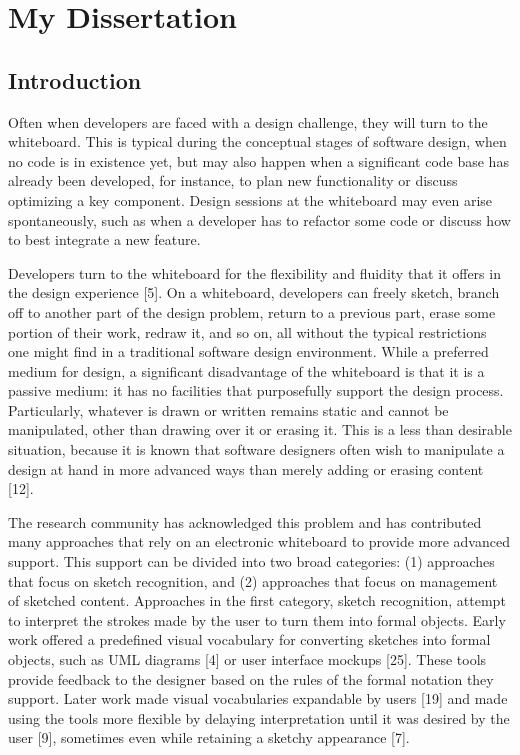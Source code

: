 \chapter{My Dissertation}
\label{chapter:thesis}

\section{Introduction}

Often when developers are faced with a design challenge, they will turn to the whiteboard.  This is typical during the conceptual stages of software design, when no code is in existence yet, but may also happen when a significant code base has already been developed, for instance, to plan new functionality or discuss optimizing a key component. Design sessions at the whiteboard may even arise spontaneously, such as when a developer has to refactor some code or discuss how to best integrate a new feature.

Developers turn to the whiteboard for the flexibility and fluidity that it offers in the design experience [5]. On a whiteboard, developers can freely sketch, branch off to another part of the design problem, return to a previous part, erase some portion of their work, redraw it, and so on, all without the typical restrictions one might find in a traditional software design environment. 
While a preferred medium for design, a significant disadvantage of the whiteboard is that it is a passive medium: it has no facilities that purposefully support the design process. Particularly, whatever is drawn or written remains static and cannot be manipulated, other than drawing over it or erasing it. This is a less than desirable situation, because it is known that software designers often wish to manipulate a design at hand in more advanced ways than merely adding or erasing content [12].

The research community has acknowledged this problem and has contributed many approaches that rely on an electronic whiteboard to provide more advanced support. This support can be divided into two broad categories: (1) approaches that focus on sketch recognition, and (2) approaches that focus on management of sketched content. Approaches in the first category, sketch recognition, attempt to interpret the strokes made by the user to turn them into formal  objects. Early work offered a predefined visual vocabulary for converting sketches into formal objects, such as UML diagrams [4] or user interface mockups [25]. These tools provide feedback to the designer based on the rules of the formal notation they support. Later work made visual vocabularies expandable by users [19] and made using the tools more flexible by delaying interpretation until it was desired by the user [9], sometimes even while retaining a sketchy appearance [7].

